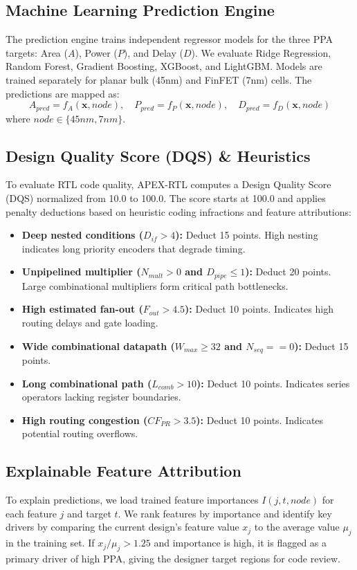 \documentclass[conference]{IEEEtran}
\begin{document}
\subsection{Machine Learning Prediction Engine}
The prediction engine trains independent regressor models for the three PPA targets: Area ($A$), Power ($P$), and Delay ($D$). We evaluate Ridge Regression, Random Forest, Gradient Boosting, XGBoost, and LightGBM. Models are trained separately for planar bulk (45nm) and FinFET (7nm) cells. The predictions are mapped as:
\begin{equation}
    A_{pred} = f_A(\mathbf{x}, node), \quad P_{pred} = f_P(\mathbf{x}, node), \quad D_{pred} = f_D(\mathbf{x}, node)
\end{equation}
where $node \in \{45nm, 7nm\}$.

\subsection{Design Quality Score (DQS) & Heuristics}
To evaluate RTL code quality, APEX-RTL computes a Design Quality Score (DQS) normalized from 10.0 to 100.0. The score starts at 100.0 and applies penalty deductions based on heuristic coding infractions and feature attributions:
\begin{itemize}
    \item \textbf{Deep nested conditions ($D_{if} > 4$):} Deduct 15 points. High nesting indicates long priority encoders that degrade timing.
    \item \textbf{Unpipelined multiplier ($N_{mult} > 0$ and $D_{pipe} \le 1$):} Deduct 20 points. Large combinational multipliers form critical path bottlenecks.
    \item \textbf{High estimated fan-out ($F_{out} > 4.5$):} Deduct 10 points. Indicates high routing delays and gate loading.
    \item \textbf{Wide combinational datapath ($W_{max} \ge 32$ and $N_{seq} == 0$):} Deduct 15 points.
    \item \textbf{Long combinational path ($L_{comb} > 10$):} Deduct 10 points. Indicates series operators lacking register boundaries.
    \item \textbf{High routing congestion ($CF_{PR} > 3.5$):} Deduct 10 points. Indicates potential routing overflows.
\end{itemize}

\subsection{Explainable Feature Attribution}
To explain predictions, we load trained feature importances $I(j, t, node)$ for each feature $j$ and target $t$. We rank features by importance and identify key drivers by comparing the current design's feature value $x_j$ to the average value $\mu_j$ in the training set. If $x_j / \mu_j > 1.25$ and importance is high, it is flagged as a primary driver of high PPA, giving the designer target regions for code review.
\end{document}

